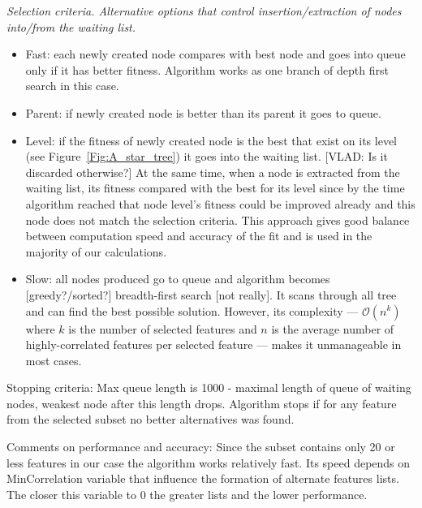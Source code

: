 \documentclass[aps,prl,reprint,amsmath,amssymb,nature]{revtex4-1}
\begin{document}
\textit{Selection criteria. Alternative options that control insertion/extraction of nodes into/from the waiting list.}
\begin{itemize}
\item Fast: each newly created node compares with best node and goes into queue only if it has better fitness. Algorithm works as one branch of depth first search in this case.
\item Parent: if newly created node is better than its parent it goes to queue.
\item Level: if the fitness of newly created node is the best that exist on its level (see Figure~\ref{Fig:A_star_tree}) it goes into the waiting list. [VLAD: Is it discarded otherwise?] At the same time, when a node is extracted from the waiting list, its fitness compared with the best for its level since by the time algorithm reached that node level's fitness could be improved already and this node does not match the selection criteria. This approach gives good balance between computation speed and accuracy of the fit and is used in the majority of our calculations.
\item Slow: all nodes produced go to queue and algorithm becomes [greedy?/sorted?] breadth-first search [not really]. It scans through all tree and can find the best possible solution. However, its complexity --- $\mathcal{O}(n^k)$ where $k$ is the number of selected features and $n$ is the average number of highly-correlated features per selected feature --- makes it unmanageable in most cases.
\end{itemize}

Stopping criteria: Max queue length is 1000 - maximal length of queue of waiting nodes, weakest node after this length drops. Algorithm stops if for any feature from the selected subset no better alternatives was found. 


Comments on performance and accuracy: Since the subset contains only 20 or less features in our case the algorithm works relatively fast. Its speed depends on MinCorrelation variable that influence the formation of alternate features lists. The closer this variable to 0 the greater lists and the lower performance. %
\end{document}
